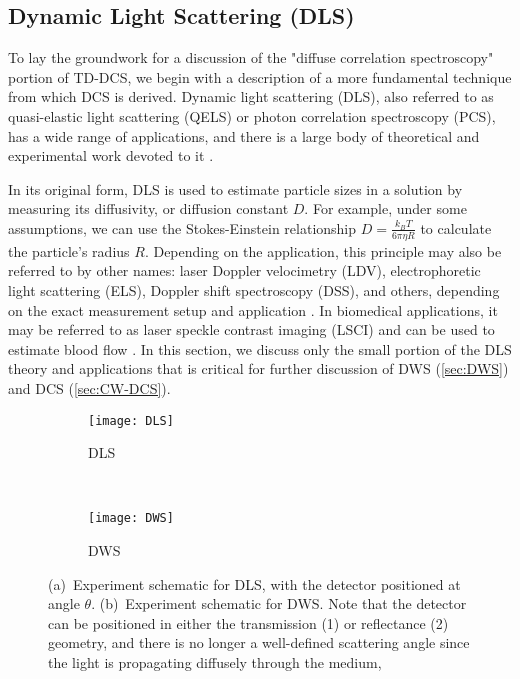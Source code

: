 \subsection{Dynamic Light Scattering (DLS)} \label{sec:DLS}
To lay the groundwork for a discussion of the "diffuse correlation spectroscopy" portion of TD-DCS, we begin with a description of a more fundamental technique from which DCS is derived. Dynamic light scattering (DLS), also referred to as quasi-elastic light scattering (QELS) or photon correlation spectroscopy (PCS), has a wide range of applications, and there is a large body of theoretical and experimental work devoted to it \cite{Schmitz1990, Pecora1985, BernePecora1976, Brown1993}.  

In its original form, DLS is used to estimate particle sizes in a solution by measuring its diffusivity, or diffusion constant $D$. For example, under some assumptions, we can use the Stokes-Einstein relationship $D = \frac{k_B T}{6\pi\eta R}$ to calculate the particle's radius $R$. Depending on the application, this principle may also be referred to by other names: laser Doppler velocimetry (LDV), electrophoretic light scattering (ELS), Doppler shift spectroscopy (DSS), and others, depending on the exact measurement setup and application \cite[ch. 1.4]{Schmitz1990}. In biomedical applications, it may be referred to as laser speckle contrast imaging (LSCI) and can be used to estimate blood flow \cite[ch. 5]{Madsen2013}. In this section, we discuss only the small portion of the DLS theory and applications that is critical for further discussion of DWS (\autoref{sec:DWS}) and DCS (\autoref{sec:CW-DCS}).

\begin{figure}[tb]
    \centering
    \begin{subfigure}[t]{0.5\textwidth}
        \centering
        \texttt{[image: DLS]}
        \caption{DLS}
        \label{fig:DLS_setup}
    \end{subfigure}~%
    \begin{subfigure}[t]{0.5\textwidth}
        \centering
        \texttt{[image: DWS]}
        \caption{DWS}
        \label{fig:DWS_setup}        
    \end{subfigure}  
    \caption{(a)~Experiment schematic for DLS, with the detector positioned at angle $\theta$. (b)~Experiment schematic for DWS. Note that the detector can be positioned in either the transmission (1) or reflectance (2) geometry, and there is no longer a well-defined scattering angle since the light is propagating diffusely through the medium,}  
\end{figure}


